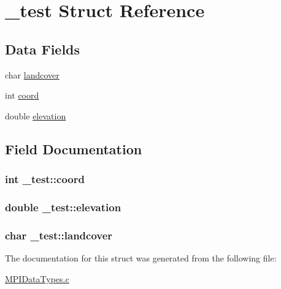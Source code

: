 \hypertarget{struct__test}{\section{\-\_\-test Struct Reference}
\label{struct__test}
}
\subsection*{Data Fields}
\begin{DoxyCompactItemize}
\item 
char \hyperlink{struct__test_ab4ddbda022cf86dfad1c7405feb8acdf}{landcover}
\item 
int \hyperlink{struct__test_a8a75ad7b07875699f2e56a0cfba90015}{coord}
\item 
double \hyperlink{struct__test_a304d9c5eb29e37799d2912f092b75db4}{elevation}
\end{DoxyCompactItemize}


\subsection{Field Documentation}
\hypertarget{struct__test_a8a75ad7b07875699f2e56a0cfba90015}{
\subsubsection[{coord}]{\setlength{\rightskip}{0pt plus 5cm}int \-\_\-test\-::coord}}\label{struct__test_a8a75ad7b07875699f2e56a0cfba90015}
\hypertarget{struct__test_a304d9c5eb29e37799d2912f092b75db4}{
\subsubsection[{elevation}]{\setlength{\rightskip}{0pt plus 5cm}double \-\_\-test\-::elevation}}\label{struct__test_a304d9c5eb29e37799d2912f092b75db4}
\hypertarget{struct__test_ab4ddbda022cf86dfad1c7405feb8acdf}{
\subsubsection[{landcover}]{\setlength{\rightskip}{0pt plus 5cm}char \-\_\-test\-::landcover}}\label{struct__test_ab4ddbda022cf86dfad1c7405feb8acdf}


The documentation for this struct was generated from the following file\-:\begin{DoxyCompactItemize}
\item 
\hyperlink{MPIDataTypes_8c}{M\-P\-I\-Data\-Types.\-c}\end{DoxyCompactItemize}
